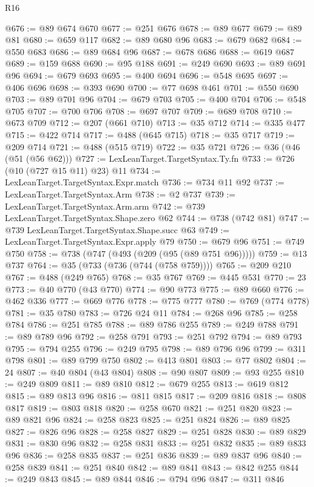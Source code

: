 \begin{lexlean}{R16}
\begin{coremodule}
@676 := @89 @674 @670
@677 := @251 @676
@678 := @89 @677
@679 := @89 @81
@680 := @659 @117
@682 := @89 @680 @96
@683 := @679 @682
@684 := @550 @683
@686 := @89 @684 @96
@687 := @678 @686
@688 := @619 @687
@689 := @159 @688
@690 := @95 @188
@691 := @249 @690
@693 := @89 @691 @96
@694 := @679 @693
@695 := @400 @694
@696 := @548 @695
@697 := @406 @696
@698 := @393 @690
@700 := @77 @698 @461
@701 := @550 @690
@703 := @89 @701 @96
@704 := @679 @703
@705 := @400 @704
@706 := @548 @705
@707 := @700 @706
@708 := @697 @707
@709 := @689 @708
@710 := @673 @709
@712 := @207 (@661 @710)
@713 := @35 @712
@714 := @335 @477
@715 := @422 @714
@717 := @488 (@645 @715)
@718 := @35 @717
@719 := @209 @714
@721 := @488 (@515 @719)
@722 := @35 @721
@726 := @36 (@46 (@51 (@56 @62)))
@727 := LexLeanTarget.TargetSyntax.Ty.fn
@733 := @726 (@10 (@727 @15 @11) @23) @11
@734 := LexLeanTarget.TargetSyntax.Expr.match
@736 := @734 @11 @92
@737 := LexLeanTarget.TargetSyntax.Arm
@738 := @2 @737
@739 := LexLeanTarget.TargetSyntax.Arm.arm
@742 := @739 LexLeanTarget.TargetSyntax.Shape.zero @62
@744 := @738 (@742 @81)
@747 := @739 LexLeanTarget.TargetSyntax.Shape.succ @63
@749 := LexLeanTarget.TargetSyntax.Expr.apply @79
@750 := @679 @96
@751 := @749 @750
@758 := @738 (@747 (@493 (@209 (@95 (@89 @751 @96)))))
@759 := @13 @737
@764 := @35 (@733 (@736 (@744 (@758 @759))))
@765 := @209 @210
@767 := @488 (@249 @765)
@768 := @35 @767
@769 := @445 @531
@770 := 23
@773 := @40 @770 (@43 @770)
@774 := @90 @773
@775 := @89 @660
@776 := @462 @336
@777 := @669 @776
@778 := @775 @777
@780 := @769 (@774 @778)
@781 := @35 @780
@783 := @726 @24 @11
@784 := @268 @96
@785 := @258 @784
@786 := @251 @785
@788 := @89 @786 @255
@789 := @249 @788
@791 := @89 @789 @96
@792 := @258 @791
@793 := @251 @792
@794 := @89 @793
@795 := @794 @255
@796 := @249 @795
@798 := @89 @796 @96
@799 := @311 @798
@801 := @89 @799 @750
@802 := @413 @801
@803 := @77 @802
@804 := 24
@807 := @40 @804 (@43 @804)
@808 := @90 @807
@809 := @93 @255
@810 := @249 @809
@811 := @89 @810
@812 := @679 @255
@813 := @619 @812
@815 := @89 @813 @96
@816 := @811 @815
@817 := @209 @816
@818 := @808 @817
@819 := @803 @818
@820 := @258 @670
@821 := @251 @820
@823 := @89 @821 @96
@824 := @258 @823
@825 := @251 @824
@826 := @89 @825
@827 := @826 @96
@828 := @258 @827
@829 := @251 @828
@830 := @89 @829
@831 := @830 @96
@832 := @258 @831
@833 := @251 @832
@835 := @89 @833 @96
@836 := @258 @835
@837 := @251 @836
@839 := @89 @837 @96
@840 := @258 @839
@841 := @251 @840
@842 := @89 @841
@843 := @842 @255
@844 := @249 @843
@845 := @89 @844
@846 := @794 @96
@847 := @311 @846

\end{coremodule}
\end{lexlean}
